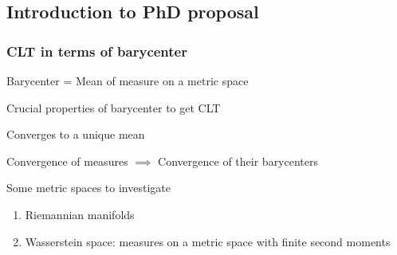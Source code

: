 \documentclass[aspectratio=169]{beamer}
\begin{document}
\subsection{Introduction to PhD proposal}
\begin{frame}
	\frametitle{CLT in terms of barycenter}
	\begin{center}
		\large Barycenter = Mean of measure on a metric space
	\end{center}
	\pause
	\begin{block}{Crucial properties of barycenter to get CLT}
		\begin{description}
			\item[Uniqueness] Converges to a unique mean
				\pause
			\item[Consistency] Convergence of measures $\implies$ Convergence of their barycenters
				\pause
		\end{description}
	\end{block}

	\begin{block}{Some metric spaces to investigate}
		\begin{enumerate}
			\item Riemannian manifolds
			      \pause
			\item Wasserstein space: measures on a metric space with finite second moments
		\end{enumerate}
	\end{block}
\end{frame}
\end{document}
